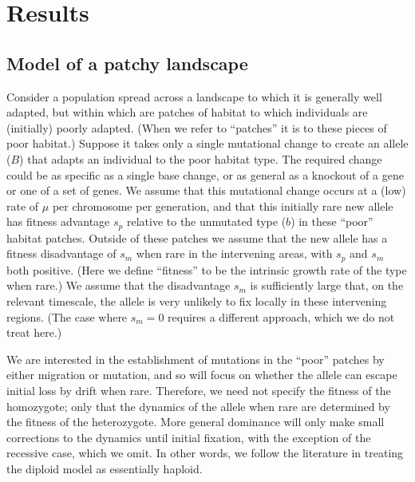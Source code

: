 \documentclass{article}
\begin{document}
\section*{Results}

\subsection{Model of a patchy landscape}
\label{ss:patchyspace}

Consider a population spread across a landscape to which it is generally well adapted,
but within which are patches of habitat to which individuals are (initially) poorly adapted.
(When we refer to ``patches'' it is to these pieces of poor habitat.)
Suppose it takes only a single mutational change to create an allele
($B$) that adapts an individual to the poor habitat type.
The required change could be as specific as a single base change, 
or as general as a knockout of a gene or one of a set of genes.
We assume that this mutational change occurs at a (low) rate of $\mu$ per chromosome per generation,
and that this initially rare new allele has fitness advantage $s_p$ relative to the unmutated type ($b$) in these ``poor'' habitat patches.
Outside of these patches we assume that the new allele has a fitness disadvantage of 
$s_m$  when rare in the intervening areas, with $s_p$ and $s_m$ both positive.
(Here we define ``fitness'' to be the intrinsic growth rate of the type when rare.)
We assume that the disadvantage $s_m$ 
is sufficiently large that, on the relevant timescale,
the allele is very unlikely to fix locally in these intervening regions.
(The case where $s_m=0$ requires a different approach, which we do not treat here.)

We are interested in the establishment of mutations in the ``poor'' patches by either
migration or mutation, and so will focus on whether the allele
can escape initial loss by drift when rare. 
Therefore, we need not specify the fitness of the homozygote; 
only that the dynamics of the allele when rare 
are determined by the fitness of the heterozygote. 
More general dominance will only make small corrections to the dynamics until initial fixation,
with the exception of the recessive case, which we omit.
In other words,
we follow the literature in treating the diploid model as essentially haploid.
\end{document}
